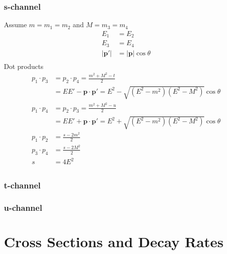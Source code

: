 \documentclass[12pt]{article}
\theoremstyle{definition}
\begin{document}
\subsubsection{s-channel}
Assume $m = m_1 = m_2$ and $M = m_3 = m_4$
\begin{equation*}
\begin{split}
    E_1 &= E_2 \\
    E_3 &= E_4 \\
    |\bm{p}'| &= |\bm{p}| \cos\theta \\
\end{split}
\end{equation*}
Dot products
\begin{equation*}
\begin{split}
    p_1 \cdot p_3 &= p_2 \cdot p_4 = \frac{m^2 + M^2 - t}{2} \\
        &= E E' - \bm{p} \cdot \bm{p}' = E^2 - \sqrt{(E^2-m^2)(E^2-M^2)} \cos\theta \\
    p_1 \cdot p_4 &= p_2 \cdot p_3 = \frac{m^2 + M^2 - u}{2} \\
        &= E E' + \bm{p} \cdot \bm{p}' = E^2 + \sqrt{(E^2-m^2)(E^2-M^2)} \cos\theta \\
    p_1 \cdot p_2 &= \frac{s - 2m^2}{2} \\
    p_3 \cdot p_4 &= \frac{s - 2M^2}{2} \\
    s &= 4E^2 \\
\end{split}
\end{equation*}

\subsubsection{t-channel}

\subsubsection{u-channel}

\section{Cross Sections and Decay Rates}
\end{document}
